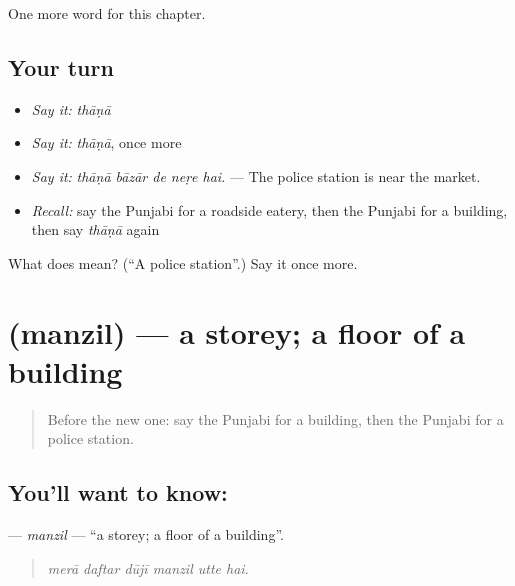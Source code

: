 \begin{grammarlens}[title={What you've built}]
One more word for this chapter.
\end{grammarlens}

\subsection*{Your turn}
\begin{itemize}
\raggedright
  \item \emph{Say it:} \emph{thāṇā}
  \item \emph{Say it:} \emph{thāṇā}, once more
  \item \emph{Say it:} \emph{thāṇā bāzār de neṛe hai.} — The police station is near the market.
  \item \emph{Recall:} say the Punjabi for a roadside eatery, then the Punjabi for a building, then say \emph{thāṇā} again
\end{itemize}

\begin{tcolorbox}[breakable,colback=teal!4,colframe=teal!35!black,title={Before you move on}]
What does  mean? (\textquotedblleft{}A police station\textquotedblright{}.) Say it once more.
\end{tcolorbox}
\section[\texorpdfstring{\pa{ਮੰਜ਼ਿਲ} (manzil)}{ਮੰਜ਼ਿਲ (manzil)}]{ (manzil) — a storey; a floor of a building}

\label{lesson:PA-C267-manzil}



\begin{quote}
Before the new one: say the Punjabi for a building, then the Punjabi for a police station.
\end{quote}

\subsection*{You'll want to know: }
\textbf{} — \emph{manzil} — \textquotedblleft{}a storey; a floor of a building\textquotedblright{}.

\begin{quote}
     
\end{quote}

\begin{quote}
\emph{merā daftar dūjī manzil utte hai.}
\end{quote}

